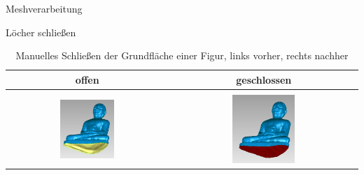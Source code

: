 \documentclass[11pt]{beamer}
\begin{document}
\begin{frame}{Meshverarbeitung}

\begin{block}{Löcher schließen}
\begin{table}[h]
	\begin{center}
		\begin{tabular}{| c | c |}
			\hline
			offen & geschlossen \\
			\hline
			\hline
			& \\
			\includegraphics[width=0.35\textwidth]{./Images/GeomagicBudhaPictures/Budha_SfM_BottomHole_2.PNG} & \includegraphics[width=0.345\textwidth]{./Images/GeomagicBudhaPictures/Budha_SfM_BottomHoleClosed_2.PNG} \\
			\hline					  
		\end{tabular}
	\end{center}
	\caption{Manuelles Schließen der Grundfläche einer Figur, links vorher, rechts nachher}
	\label{tab:BudhaHole}
\end{table}
\end{block}

\end{frame}
\end{document}
